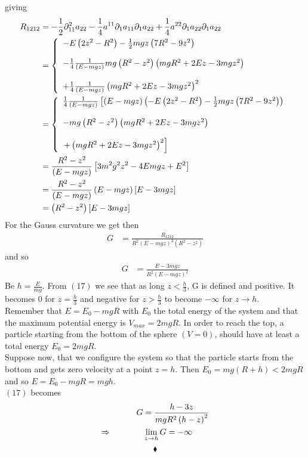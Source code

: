 giving
\begin{align}
R_{1212}&= -\frac{1}{2}\partial_{11}^2a_{22}-\frac{1}{4}a^{11}\partial_1 a_{11}\partial_1 a_{22}+\frac{1}{4}a^{22}\partial_1 a_{22}\partial_1 a_{22}\\
 &=\left\{\begin{array}{l}
 -E\left(2z^2-R^2\right)-\frac{1}{2} mgz\left(7R^2-9z^2  \right)\\\\
 -\frac{1}{4}\frac{1}{\left(E-mgz\right)}mg\left(R^2-z^2\right) \left( mgR^2 +2Ez-3 mgz^2\right) \\\\
 +\frac{1}{4}\frac{1}{\left(E-mgz\right)}\left( mgR^2 +2Ez-3 mgz^2\right)^2 
\end{array}\right.\\
 &=\left\{\begin{array}{l}
 \frac{1}{4}\frac{1}{\left(E-mgz\right)}\left[ \left(E-mgz\right)\left(-E\left(2z^2-R^2\right)-\frac{1}{2} mgz\left(7R^2-9z^2  \right)\right)\right.\\\\
 -mg\left(R^2-z^2\right) \left( mgR^2 +2Ez-3 mgz^2\right) \\\\
 \left.+\left( mgR^2 +2Ez-3 mgz^2\right)^2 \right]
\end{array}\right.\\
 &=
 \frac{R^2-z^2}{\left(E-mgz\right)}\left[ 3m^2g^2z^2 -4Emgz + E^2\right]\\
 &=
 \frac{R^2-z^2}{\left(E-mgz\right)}\left(E-mgz\right)\left[ E-3mgz\right]\\
 &=
 \left(R^2-z^2\right)\left[ E-3mgz\right]
\end{align}
For the Gauss curvature we get then 
\begin{align}
G&= \frac{R_{1212}}{R^2\left(E-mgz\right)^2\left(R^2-z^2\right)}
\end{align}
and so 
\begin{align}
G&= \frac{ E-3mgz}{R^2\left(E-mgz\right)^2}
\end{align}
Be $h= \frac{E}{mg}$. From $(17)$ we see that as long $z<\frac{h}{3}$, G is defined and positive. It becomes $0$ for $z=\frac{h}{3}$ and negative for $z>\frac{h}{3}$ to become $-\infty$ for $z\rightarrow h$.\\
Remember that $E=E_0-mgR$ with $E_0$ the total energy of the system and that the maximum potential energy is $V_{max}= 2mgR$. In order to reach the top, a particle starting from the bottom of the sphere $(V=0)$, should have at least a total energy $E_0= 2mgR$.\\
Suppose now, that we configure the system so that the particle starts from the bottom and gets zero velocity at a point $z=h$. Then $E_0= mg\left(R+h \right)<2mgR$ and so $E= E_0-mgR= mgh$.\\
 $(17)$ becomes
\begin{align}
G&= \frac{ h-3z}{mgR^2\left(h-z\right)^2}\\
\Rightarrow\quad\quad\quad\quad &\lim_{ z\to h}G=-\infty
\end{align}
$$\blacklozenge$$
\newpage


